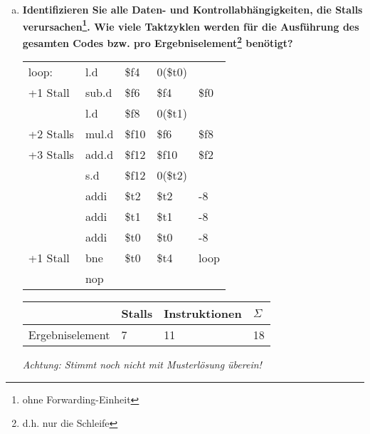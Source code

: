 \begin{enumerate}[(a)]
	\item \textbf{Identifizieren Sie alle Daten- und Kontrollabhängigkeiten, die Stalls	verursachen\footnote{ohne Forwarding-Einheit}. Wie viele Taktzyklen werden für die
	Ausführung des gesamten Codes bzw. pro Ergebniselement\footnote{d.h. nur die Schleife}
	benötigt?}

	{
		\ttfamily
		\begin{tabular}{l llll}
			loop:                       & l.d   & \color{blue}\$f4        & 0(\$t0)               &                  \\
			\color{blue} +1 Stall       & sub.d & \color{brown}\$f6       & \color{blue}\$f4      & \$f0             \\
			                            & l.d   & \color{cyan}\$f8        & 0(\$t1)               &                  \\
			\color{brown}+2 Stalls      & mul.d & \color{Mulberry}\$f10   & \color{brown}\$f6     & \color{cyan}\$f8 \\
			\color{Mulberry}+3 Stalls   & add.d & \$f12                   & \color{Mulberry}\$f10 & \$f2             \\
			                            & s.d   & \$f12                   & 0(\$t2)               &                  \\
			                            & addi  & \$t2                    & \$t2                  & -8               \\
			                            & addi  & \$t1                    & \$t1                  & -8               \\
			                            & addi  & \color{Bittersweet}\$t0 & \$t0                  & -8               \\
			\color{Bittersweet}+1 Stall & bne   & \color{Bittersweet}\$t0 & \$t4                  & loop             \\
			                            & nop   &                         &                       &
		\end{tabular}
	}
	\begin{tabular}{llll}
		\hline
		                & Stalls & Instruktionen & $ \Sigma $ \\ \hline
		Ergebniselement & 7      & 11            & 18         \\ \hline
	\end{tabular}
	\textit{Achtung: Stimmt noch nicht mit Musterlösung überein!}
\end{enumerate}